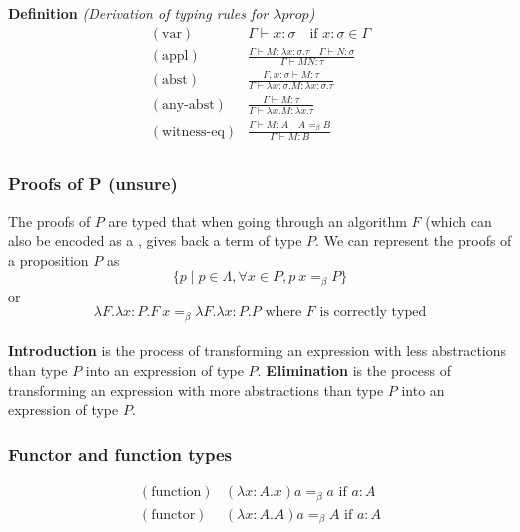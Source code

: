 \noindent \textbf{Definition} \quad \textit{(Derivation of typing rules for \(\lambda prop\))}
\[
\begin{array}{ll}
    (\text{var}) & \displaystyle{\Gamma \vdash x : \sigma \quad \text{if } x : \sigma \in \Gamma} \\[2.5ex]
    (\text{appl}) & \displaystyle\frac{\Gamma \vdash M : \lambda x: \sigma.\tau \quad \Gamma \vdash N : \sigma}{\Gamma \vdash MN : \tau} \\[2.5ex]
    (\text{abst}) & \displaystyle\frac{\Gamma, x : \sigma \vdash M : \tau}{\Gamma \vdash \lambda x : \sigma. M : \lambda x \colon \sigma.\tau} \\[2.5ex]
    (\text{any-abst}) & \displaystyle\frac{\Gamma \vdash M : \tau}{\Gamma \vdash \lambda x . M : \lambda x.\tau} \\[2.5ex]
    (\text{witness-eq}) & \displaystyle\frac{\Gamma \vdash M : A \quad A=_{\beta}B}{\Gamma \vdash M : B} \\[2.5ex]
\end{array}
\]

\subsubsection{Proofs of P (unsure)}

The proofs of $P$ are typed \lterms that when going through an algorithm $F$ (which can also be encoded as a \lterm, gives back a term of type $P$. We can represent the proofs of a proposition $P$ as
\[
    \{p \mid p \in \Lambda, \forall x \in P,p\ x=_{\beta} P\}
\]
or
\[
    \lambda F.\lambda x:P.F\ x =_{\beta} \lambda F.\lambda x:P.P\text{ where $F$ is correctly typed}
\]
\\
\textbf{Introduction} is the process of transforming an expression with less abstractions than type $P$ into an expression of type $P$.
\textbf{Elimination} is the process of transforming an expression with more abstractions than type $P$ into an expression of type $P$.

\subsubsection{Functor and function types}

\[
\begin{array}{ll}
    (\text{function}) & (\lambda x:A.x) a =_{\beta} a \text{ if } a:A \\
    (\text{functor}) & (\lambda x:A.A) a =_{\beta} A \text{ if } a:A
\end{array}
\]

